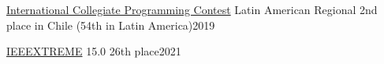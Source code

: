 \documentclass[../main.tex]{subfiles}
\begin{document}
\href{https://icpc.global/}{International Collegiate Programming Contest} Latin American Regional 2nd place in Chile (54th in Latin America)\hfill 2019\par
\href{https://ieeextreme.org/}{IEEEXTREME} 15.0 26th place\hfill 2021\par
\end{document}
